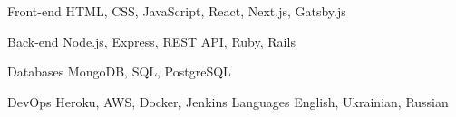 

\begin{cvskills}
  \cvskill
    {Front-end} %
    {HTML, CSS, JavaScript, React, Next.js, Gatsby.js } %

  \cvskill
    {Back-end} %
    {Node.js, Express, REST API, Ruby, Rails} %

  \cvskill
    {Databases} %
    {MongoDB, SQL, PostgreSQL} %

  \cvskill
    {DevOps} %
    {Heroku, AWS, Docker, Jenkins} %
  \cvskill
    {Languages} %
    {English, Ukrainian, Russian} %

\end{cvskills}
